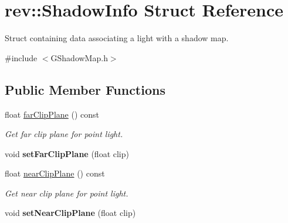 \hypertarget{structrev_1_1_shadow_info}{}\section{rev\+::Shadow\+Info Struct Reference}
\label{structrev_1_1_shadow_info}


Struct containing data associating a light with a shadow map.  




{\ttfamily \#include $<$G\+Shadow\+Map.\+h$>$}

\subsection*{Public Member Functions}
\begin{DoxyCompactItemize}
\item 
\mbox{\label{structrev_1_1_shadow_info_a9b8f7e46a21268630980938137b104e4}} 
float \mbox{\hyperlink{structrev_1_1_shadow_info_a9b8f7e46a21268630980938137b104e4}{far\+Clip\+Plane}} () const
\begin{DoxyCompactList}\small\item\em Get far clip plane for point light. \end{DoxyCompactList}\item 
\mbox{\label{structrev_1_1_shadow_info_a39325ef5cd4290c1b89a2f6199e391e6}} 
void {\bfseries set\+Far\+Clip\+Plane} (float clip)
\item 
\mbox{\label{structrev_1_1_shadow_info_a3f3678ea6f00dc0db14a1862cec97ddf}} 
float \mbox{\hyperlink{structrev_1_1_shadow_info_a3f3678ea6f00dc0db14a1862cec97ddf}{near\+Clip\+Plane}} () const
\begin{DoxyCompactList}\small\item\em Get near clip plane for point light. \end{DoxyCompactList}\item 
\mbox{\label{structrev_1_1_shadow_info_a5944cfba8a0ae18689988f210b6a3a66}} 
void {\bfseries set\+Near\+Clip\+Plane} (float clip)
\end{DoxyCompactItemize}
